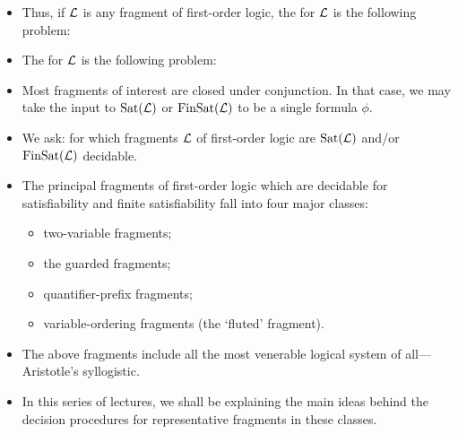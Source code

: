 \documentclass{beamer}
\begin{document}
\begin{frame}
	\begin{itemize}
		\item Thus, if $\mathcal{L}$ is any fragment of first-order logic,
		the  for $\mathcal{L}$ is the following problem: 
		\item The  for $\mathcal{L}$ is the following problem: 
		\item Most fragments of interest are closed under conjunction. In that case, we may take the input to $\mbox{\rm Sat}(\mathcal{L})$ or $\mbox{\rm FinSat}(\mathcal{L})$ to be a single formula $\phi$.
		\item We ask: for which fragments $\mathcal{L}$ of first-order logic  are $\mbox{\rm Sat}(\mathcal{L})$ and/or $\mbox{\rm FinSat}(\mathcal{L})$ decidable.
	\end{itemize}
\end{frame}

\begin{frame}
\begin{itemize}
\item The principal fragments of first-order logic which are decidable
for satisfiability and finite satisfiability fall into four major classes:
\begin{itemize}
	\item two-variable fragments;
	\item the guarded fragments;
	\item quantifier-prefix fragments;
	\item variable-ordering fragments (the `fluted' fragment).
\end{itemize} 
\item 
The above fragments include all the most venerable logical system of all---Aristotle's syllogistic.
\item In this series of lectures, we shall be explaining the main ideas behind the decision procedures for representative fragments in these classes.
\end{itemize}
\end{frame}

%
\end{document}
